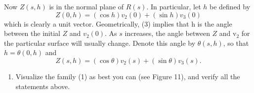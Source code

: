 \documentclass{book}
\begin{document}
Now $Z(s,h)$ is in the normal plane of $R(s)$. In particular, let $h$ be defined by
\begin{equation}
Z(0,h) = (\cos h) v_{2}(0) + (\sin h) v_{3}(0)
\end{equation}
which is clearly a unit vector. Geometrically, (3) implies that h is the angle between the initial $Z$ and $v_{2}(0)$. As $s$ increases, the angle between $Z$ and v$_{2}$ for the particular surface will usually change. Denote this angle by $\theta (s,h)$, so that $h = \theta (0,h)$ and
\begin{equation}
Z(s,h) = (\cos \theta) v_{2}(s) + (\sin \theta) v_{3}(s).
\end{equation}

\begin{enumerate}[1.]
  \item Visualize the family (1) as best you can (see Figure 11), and verify all the statements above. 


\end{enumerate}
\end{document}
